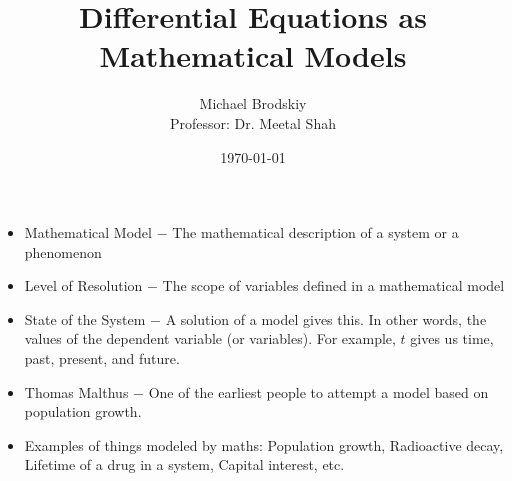 \documentclass[12pt]{article}
\title{Differential Equations as Mathematical Models}
\date{\today}
\author{Michael Brodskiy\\ \small Professor: Dr. Meetal Shah}
\begin{document}
\maketitle

\begin{itemize}

  \item Mathematical Model $-$ The mathematical description of a system or a phenomenon

  \item Level of Resolution $-$ The scope of variables defined in a mathematical model

  \item State of the System $-$ A solution of a model gives this. In other words, the values of the dependent variable (or variables). For example, $t$ gives us time, past, present, and future.

  \item Thomas Malthus $-$ One of the earliest people to attempt a model based on population growth. 

  \item Examples of things modeled by maths: Population growth, Radioactive decay, Lifetime of a drug in a system, Capital interest, etc.

\end{itemize}
\end{document}
